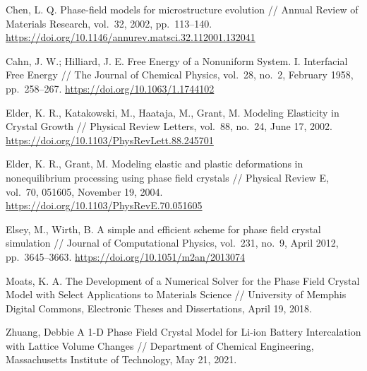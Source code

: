 %
%

\begin{thebibliography}{99}

  Chen, L. Q.
  Phase-field models for microstructure evolution //
  Annual Review of Materials Research, vol.~32, 2002, pp.~113–140.
  \url{https://doi.org/10.1146/annurev.matsci.32.112001.132041}

    Cahn, J. W.; Hilliard, J. E.
    Free Energy of a Nonuniform System. I. Interfacial Free Energy //
    The Journal of Chemical Physics, vol.~28, no.~2, February 1958, pp.~258–267.
    \url{https://doi.org/10.1063/1.1744102}

  Elder, K. R., Katakowski, M., Haataja, M., Grant, M.
  Modeling Elasticity in Crystal Growth //
  Physical Review Letters, vol.~88, no.~24, June 17, 2002.
  \url{https://doi.org/10.1103/PhysRevLett.88.245701}

  Elder, K. R., Grant, M.
  Modeling elastic and plastic deformations in nonequilibrium processing using phase field crystals //
  Physical Review E, vol.~70, 051605, November 19, 2004.
  \url{https://doi.org/10.1103/PhysRevE.70.051605}

  Elsey, M., Wirth, B.
  A simple and efficient scheme for phase field crystal simulation //
  Journal of Computational Physics, vol.~231, no.~9, April 2012, pp.~3645–3663.
  \url{https://doi.org/10.1051/m2an/2013074}

  Moats, K. A.
  The Development of a Numerical Solver for the Phase Field Crystal Model with Select Applications to Materials Science //
  University of Memphis Digital Commons, Electronic Theses and Dissertations, April 19, 2018.

  Zhuang, Debbie
  A 1-D Phase Field Crystal Model for Li-ion Battery Intercalation with Lattice Volume Changes //
  Department of Chemical Engineering, Massachusetts Institute of Technology, May 21, 2021.

\end{thebibliography}
